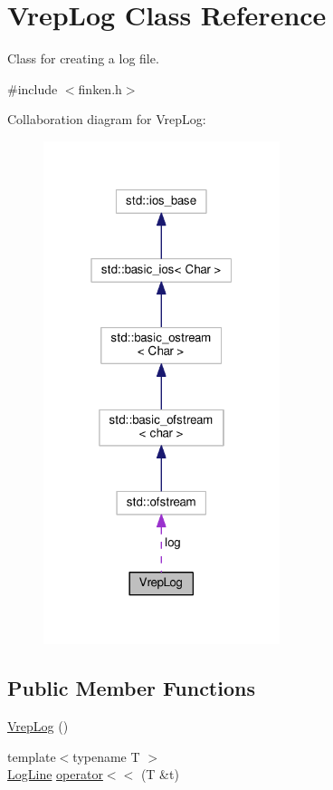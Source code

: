 \hypertarget{classVrepLog}{}\section{Vrep\+Log Class Reference}
\label{classVrepLog}


Class for creating a log file.  




{\ttfamily \#include $<$finken.\+h$>$}



Collaboration diagram for Vrep\+Log\+:\nopagebreak
\begin{figure}[H]
\begin{center}
\leavevmode
\includegraphics[width=196pt]{classVrepLog__coll__graph}
\end{center}
\end{figure}
\subsection*{Public Member Functions}
\begin{DoxyCompactItemize}
\item 
\hyperlink{classVrepLog_aa4e87cecbabab9b1eed0b42f97a56152}{Vrep\+Log} ()
\item 
{\footnotesize template$<$typename T $>$ }\\\hyperlink{classLogLine}{Log\+Line} \hyperlink{classVrepLog_a1a2744fc0ca891c3bf9767395791914b}{operator$<$$<$} (T \&t)
\end{DoxyCompactItemize}
